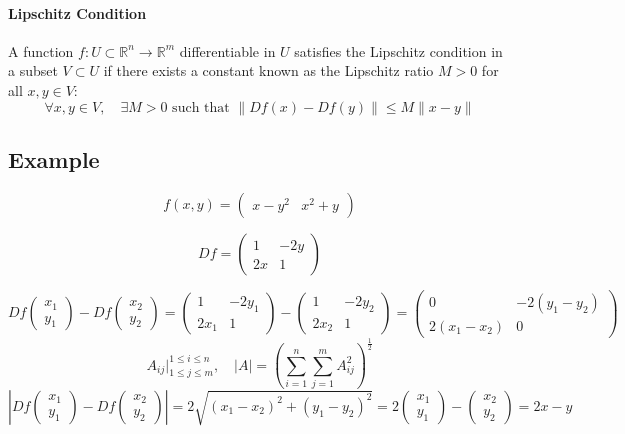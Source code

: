 \documentclass[11pt]{article}
\begin{document}
\paragraph{Lipschitz Condition}
A function $f : U \subset \mathbb{R}^n \rightarrow \mathbb{R}^m$ differentiable in $U$ satisfies the Lipschitz condition in a subset $V \subset U$ if there exists a constant known as the Lipschitz ratio $M > 0$ for all $x,y \in V$:
\[
\forall x,y \in V, \quad \exists M > 0 \text{ such that } \| Df(x) - Df(y) \| \leq M \| x - y \|
\]

\subsection*{Example}
\[
f(x,y) = \begin{pmatrix}
    x - y^2 & x^2 + y
\end{pmatrix}
\]

\[
Df = \begin{pmatrix}
    1 & -2y \\
    2x & 1
\end{pmatrix}
\]

\[
Df \begin{pmatrix}
    x_1 \\
    y_1
\end{pmatrix} - Df \begin{pmatrix}
    x_2 \\
    y_2
\end{pmatrix} = \begin{pmatrix}
    1 & -2y_1 \\
    2x_1 & 1
\end{pmatrix} - \begin{pmatrix}
    1 & -2y_2 \\
    2x_2 & 1
\end{pmatrix} = \begin{pmatrix}
    0 & -2(y_1 - y_2) \\
    2(x_1 - x_2) & 0
\end{pmatrix}
\]
\[
A_{ij}\big|_{1 \leq j \leq m}^{1 \leq i \leq n}, \quad |A| = \left(\sum_{i=1}^{n} \sum_{j=1}^{m} A_{ij}^2 \right)^{\frac{1}{2}}
\]
\[
\left|Df \begin{pmatrix}
    x_1 \\
    y_1
\end{pmatrix} - Df \begin{pmatrix}
    x_2 \\
    y_2
\end{pmatrix}\right| = 2 \sqrt{(x_1 - x_2)^2 + (y_1 - y_2)^2} = 2 \begin{pmatrix}
    x_1 \\
    y_1
\end{pmatrix} - \begin{pmatrix}
    x_2 \\
    y_2
\end{pmatrix}  = 2  x - y 
\]
\end{document}
